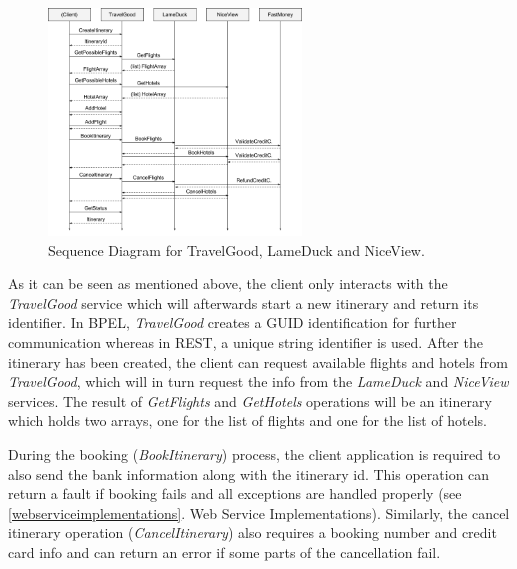 \begin{figure}[H]
\centering
\includegraphics[width=0.6\textwidth]{images/SequenceDiagram}
\caption{Sequence Diagram for TravelGood, LameDuck and NiceView.}
\label{sequencediagram}
\end{figure}

As it can be seen as mentioned above, the client only interacts with the \textit{TravelGood} service which will afterwards start a new itinerary and return its identifier. In BPEL, \textit{TravelGood} creates a GUID identification for further communication whereas in REST, a unique string identifier is used. After the itinerary has been created, the client can request available flights and hotels from \textit{TravelGood}, which will in turn request the info from the \textit{LameDuck} and \textit{NiceView} services. The result of \textit{GetFlights} and \textit{GetHotels} operations will be an itinerary which holds two arrays, one for the list of flights and one for the list of hotels. 

During the booking (\textit{BookItinerary}) process, the client application is required to also send the bank information along with the itinerary id. This operation can return a fault if booking fails and all exceptions are handled properly (see \ref{webserviceimplementations}. Web Service Implementations). 
Similarly, the cancel itinerary operation (\textit{CancelItinerary}) also requires a booking number and credit card info and can return an error if some parts of the cancellation fail.
